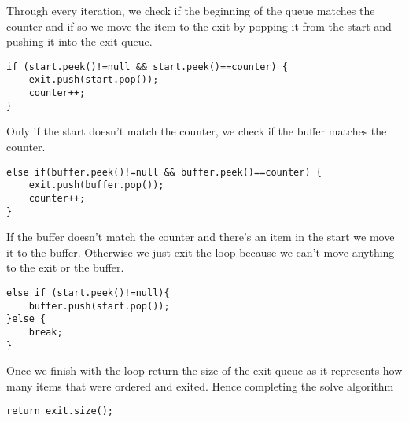 \documentclass{article}
\begin{document}
Through every iteration, we check if the beginning of the queue matches the counter and if so we move the item to the exit by popping it from the start and pushing it into the exit queue.

\begin{lstlisting}
if (start.peek()!=null && start.peek()==counter) {
    exit.push(start.pop());
    counter++;
}

\end{lstlisting}
Only if the start doesn't match the counter, we check if the buffer matches the counter.


\begin{lstlisting}
else if(buffer.peek()!=null && buffer.peek()==counter) {
    exit.push(buffer.pop());
    counter++;
}
\end{lstlisting}

If the buffer doesn't match the counter and there's an item in the start we move it to the buffer. Otherwise we just exit the loop because we can't move anything to the exit or the buffer.  
\begin{lstlisting}
else if (start.peek()!=null){
    buffer.push(start.pop());
}else {
    break;
}
\end{lstlisting}

Once we finish with the loop return the size of the exit queue as it represents how many items that were ordered and exited. Hence completing the solve algorithm
\begin{lstlisting}
return exit.size();
\end{lstlisting}
\end{document}
